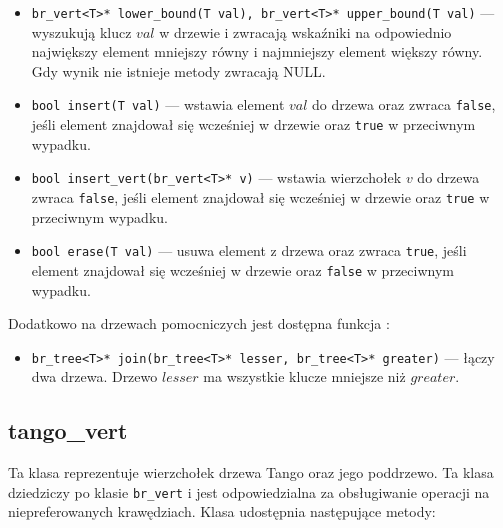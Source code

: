 \documentclass[declaration,shortabstract]{iithesis}
\theoremstyle{thm}
\theoremstyle{remark}
\theoremstyle{plain}
\theoremstyle{plain}
\theoremstyle{plain}
\begin{document}
\begin{itemize}
\item{\texttt{br\_vert<T>* lower\_bound(T val), br\_vert<T>* upper\_bound(T val)} --- wyszukują klucz $val$ w drzewie i zwracają wskaźniki na odpowiednio  największy element mniejszy równy i najmniejszy element większy równy. Gdy wynik nie istnieje metody zwracają NULL.}
   
\item{\texttt{bool insert(T val)} --- wstawia element $val$ do drzewa oraz zwraca \texttt{false}, jeśli element znajdował się wcześniej w drzewie oraz \texttt{true} w przeciwnym wypadku.}
\item{\texttt{bool insert\_vert(br\_vert<T>* v)} --- wstawia wierzchołek $v$ do drzewa zwraca \texttt{false}, jeśli element znajdował się wcześniej w drzewie oraz \texttt{true} w przeciwnym wypadku.}
\item{\texttt{bool erase(T val)} --- usuwa element z drzewa oraz zwraca \texttt{true}, jeśli element znajdował się wcześniej w drzewie oraz \texttt{false} w przeciwnym wypadku.}

\end{itemize}

Dodatkowo na drzewach pomocniczych jest dostępna funkcja : 

\begin{itemize}
\item{\texttt{br\_tree<T>* join(br\_tree<T>* lesser, br\_tree<T>* greater)} --- łączy dwa drzewa. Drzewo $lesser$ ma wszystkie klucze mniejsze niż $greater$.}

\end{itemize}



\subsection{tango\_vert}

Ta klasa reprezentuje wierzchołek drzewa Tango oraz jego poddrzewo. Ta klasa dziedziczy po klasie \texttt{br\_vert} i jest odpowiedzialna za obsługiwanie operacji na niepreferowanych krawędziach. Klasa udostępnia następujące metody: 
\end{document}
